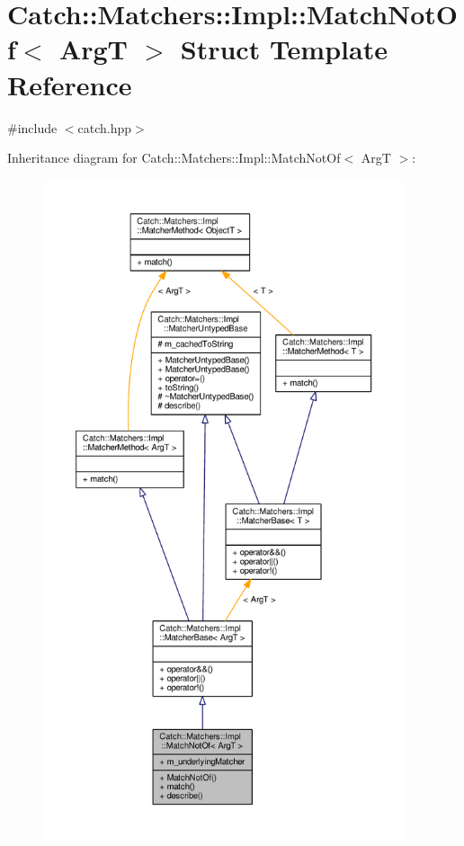 \hypertarget{struct_catch_1_1_matchers_1_1_impl_1_1_match_not_of}{\section{Catch\-:\-:Matchers\-:\-:Impl\-:\-:Match\-Not\-Of$<$ Arg\-T $>$ Struct Template Reference}
\label{struct_catch_1_1_matchers_1_1_impl_1_1_match_not_of}
}


{\ttfamily \#include $<$catch.\-hpp$>$}



Inheritance diagram for Catch\-:\-:Matchers\-:\-:Impl\-:\-:Match\-Not\-Of$<$ Arg\-T $>$\-:
\nopagebreak
\begin{figure}[H]
\begin{center}
\leavevmode
\includegraphics[height=550pt]{struct_catch_1_1_matchers_1_1_impl_1_1_match_not_of__inherit__graph}
\end{center}
\end{figure}


